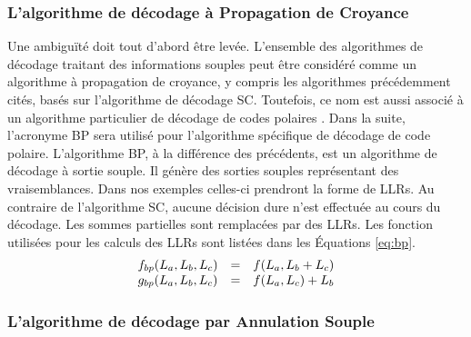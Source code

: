 \subsubsection{L'algorithme de décodage à Propagation de Croyance}
Une ambiguïté doit tout d'abord être levée. L'ensemble des algorithmes de décodage traitant des informations souples peut être considéré comme un algorithme à propagation de croyance, y compris les algorithmes précédemment cités, basés sur l'algorithme de décodage SC. Toutefois, ce nom est aussi associé à un algorithme particulier de décodage de codes polaires \cite{arikan_channel_2009}. Dans la suite, l'acronyme BP sera utilisé pour l'algorithme spécifique de décodage de code polaire. L'algorithme BP, à la différence des précédents, est un algorithme de décodage à sortie souple. Il génère des sorties souples représentant des vraisemblances. Dans nos exemples celles-ci prendront la forme de LLRs. Au contraire de l'algorithme SC, aucune décision dure n'est effectuée au cours du décodage. Les sommes partielles sont remplacées par des LLRs. Les fonction utilisées pour les calculs des LLRs sont listées dans les Équations \ref{eq:bp}.
    \begin{eqnarray}
      \begin{array}{l c l}
        f_{bp}(L_a,L_b,L_c) & = & f(L_a, L_b  + L_c) \\
        g_{bp}(L_a,L_b,L_c) & = & f(L_a, L_c) + L_b
      \end{array}
      \label{eq:bp}
    \end{eqnarray}

\subsubsection{L'algorithme de décodage par Annulation Souple}

